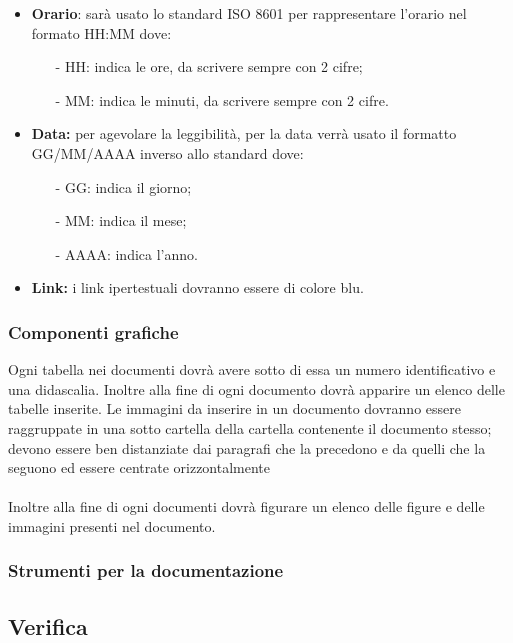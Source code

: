 \documentclass[a4paper,11pt]{article}
\begin{document}
			\begin{itemize}
				\item \textbf{Orario}: sarà usato lo standard ISO 8601 per rappresentare l'orario nel formato HH:MM dove:
					\begin{itemize}
					\item[-]HH: indica le ore, da scrivere sempre con 2 cifre;
					\item[-]MM: indica le minuti, da scrivere sempre con 2 cifre.
					\end{itemize}
				\item \textbf{Data:}  per agevolare la leggibilità, per la data verrà usato il formatto GG/MM/AAAA inverso allo standard dove:
				\begin{itemize}
				\item[-]GG: indica il giorno;
				\item[-]MM: indica il mese;
				\item[-]AAAA: indica l'anno.
				\end{itemize}
				\item \textbf{Link:} i link ipertestuali dovranno essere di colore blu.
			\end{itemize}
			\subsubsection{Componenti grafiche}
				Ogni tabella nei documenti dovrà avere sotto di essa un numero identificativo e una didascalia. Inoltre alla fine di ogni documento dovrà apparire un elenco delle tabelle inserite.
					Le immagini da inserire in un documento dovranno essere raggruppate in una sotto cartella della cartella contenente il documento stesso; devono essere ben distanziate dai paragrafi che la precedono e da quelli che la seguono ed essere centrate orizzontalmente \\ \\ 
					 Inoltre alla fine di ogni documenti dovrà figurare un elenco delle figure e delle immagini presenti nel documento.
					 
			\subsubsection{Strumenti per la documentazione}
				
			\subsection{Verifica}
\end{document}
